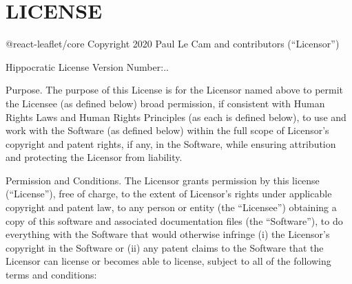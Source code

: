 \chapter{LICENSE }
\hypertarget{md_frontend_2node__modules_2_0dreact-leaflet_2core_2LICENSE}{}\label{md_frontend_2node__modules_2_0dreact-leaflet_2core_2LICENSE}
@react-\/leaflet/\+core Copyright 2020 Paul Le Cam and contributors (“\+Licensor”)

Hippocratic License Version Number:..

Purpose. The purpose of this License is for the Licensor named above to permit the Licensee (as defined below) broad permission, if consistent with Human Rights Laws and Human Rights Principles (as each is defined below), to use and work with the Software (as defined below) within the full scope of Licensor’s copyright and patent rights, if any, in the Software, while ensuring attribution and protecting the Licensor from liability.

Permission and Conditions. The Licensor grants permission by this license (“\+License”), free of charge, to the extent of Licensor’s rights under applicable copyright and patent law, to any person or entity (the “\+Licensee”) obtaining a copy of this software and associated documentation files (the “\+Software”), to do everything with the Software that would otherwise infringe (i) the Licensor’s copyright in the Software or (ii) any patent claims to the Software that the Licensor can license or becomes able to license, subject to all of the following terms and conditions:\+


